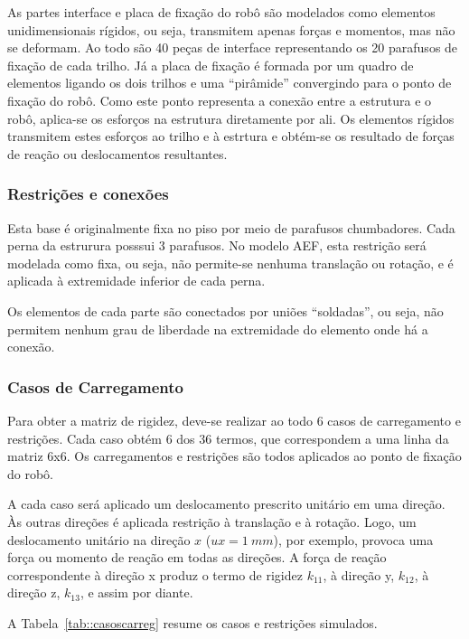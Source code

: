 As partes interface e placa de fixação do robô são modelados como elementos
unidimensionais rígidos, ou seja, transmitem apenas forças e momentos, mas não
se deformam. Ao todo são 40 peças de interface representando os 20 parafusos de
fixação de cada trilho. Já a placa de fixação é formada por um quadro de
elementos ligando os dois trilhos e uma ``pirâmide'' convergindo para o ponto de
fixação do robô. Como este ponto representa a conexão entre a estrutura e o
robô, aplica-se os esforços na estrutura diretamente por ali. Os elementos
rígidos transmitem estes esforços ao trilho e à estrtura e obtém-se os resultado
de forças de reação ou deslocamentos resultantes.


\subsubsection{Restrições e conexões}

Esta base é originalmente fixa no piso por meio de parafusos chumbadores. Cada
perna da estrurura posssui 3 parafusos. No modelo AEF, esta restrição será
modelada como fixa, ou seja, não permite-se nenhuma translação ou rotação, e
é aplicada à extremidade inferior de cada perna.

Os elementos de cada parte são conectados por uniões ``soldadas'', ou seja, não
permitem nenhum grau de liberdade na extremidade do elemento onde há a conexão.


\subsubsection{Casos de Carregamento}

Para obter a matriz de rigidez, deve-se realizar ao todo 6 casos de carregamento
e restrições. Cada caso obtém 6 dos 36 termos, que correspondem a uma linha
da matriz 6x6. Os carregamentos e restrições são todos aplicados ao ponto de
fixação do robô.

A cada caso será aplicado um deslocamento prescrito unitário em uma direção. Às
outras direções é aplicada restrição à translação e à rotação. Logo, um
deslocamento unitário na direção $x$ ($ux = 1~mm$), por exemplo, provoca uma
força ou momento de reação em todas as direções. A força de reação
correspondente à direção x produz o termo de rigidez $k_{11}$, à direção y, $k_{12}$,
à direção z, $k_{13}$, e assim por diante.

A Tabela~\ref{tab::casoscarreg} resume os casos e restrições
simulados.

